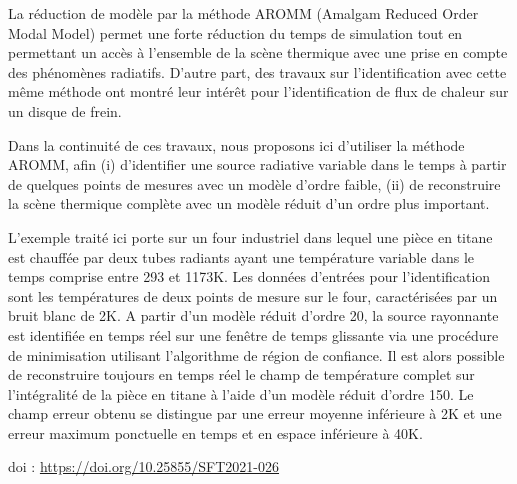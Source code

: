{\normalsize
La réduction de modèle par la méthode AROMM (Amalgam Reduced Order Modal Model) permet une forte réduction du temps de simulation tout en permettant un accès à l'ensemble de la scène thermique avec une prise en compte des phénomènes radiatifs.  D'autre part, des travaux sur l'identification avec cette même méthode ont montré leur intérêt pour l'identification de flux de chaleur sur un disque de frein. 







Dans la continuité de ces travaux, nous proposons ici d'utiliser la méthode AROMM, afin (i) d'identifier une source radiative variable dans le temps à partir de quelques points de mesures avec un modèle d'ordre faible, (ii) de reconstruire la scène thermique complète avec un modèle réduit d'un ordre plus important.







L'exemple traité ici porte sur un four industriel dans lequel une pièce en titane est chauffée par deux tubes radiants ayant une température variable dans le temps comprise entre 293 et 1173K. Les données d'entrées pour l'identification sont les températures de deux points de mesure sur le four, caractérisées par un bruit blanc de 2K. A partir d'un modèle réduit d'ordre 20, la source rayonnante est identifiée en temps réel sur une fenêtre de temps glissante via une procédure de minimisation utilisant l'algorithme de région de confiance. Il est alors possible de reconstruire toujours en temps réel le champ de température complet sur l'intégralité de la pièce en titane à l'aide d'un modèle réduit d'ordre 150. Le champ erreur obtenu se distingue par une erreur moyenne inférieure à 2K et une erreur maximum ponctuelle en temps et en espace inférieure à 40K.


 \vfill doi : \url{https://doi.org/10.25855/SFT2021-026}

}
 
